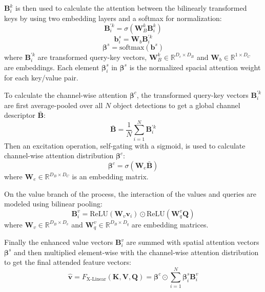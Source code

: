 \documentclass[english,twoside,openright]{HYgraduMLDS}
\newcommand{\matr}[1]{\bm{#1}}
\newcommand{\vect}[1]{\bm{#1}}
\begin{document}
$\matr{B}_i^k$ is then used to calculate the attention between the bilinearly transformed keys by using two embedding layers and a softmax for normalization:
\begin{equation}
\matr{B}_i^{'k} = \sigma(\matr{W}^k_B \matr{B}^k_i)
\end{equation}
\begin{equation}
\vect{b}^s_i = \matr{W}_b \matr{B}^{'k}_i
\end{equation}
\begin{equation}
\matr{\beta}^s = \text{softmax}(\vect{b}^s)
\end{equation}
%
where $\matr{B}_i^{'k}$ are transformed query-key vectors, $\matr{W}^k_B \in \mathbb{R}^{D_c \times D_B}$ and $\matr{W}_b \in \mathbb{R}^{1 \times D_C}$ are embeddings. Each element $\matr{\beta}^s_i$ in $\matr{\beta}^s$ is the normalized spacial attention weight for each key/value pair.

To calculate the channel-wise attention $\matr{\beta}^c$, the transformed query-key vectors $\matr{B}^{'k}_i$ are first average-pooled over all $N$ object detections to get a global channel descriptor $\bar{\matr{B}}$:
\begin{equation}
\bar{\matr{B}} = \frac{1}{N} \sum_{i=1}^N \matr{B}^{'k}_i
\end{equation}
%
Then an excitation operation, self-gating with a sigmoid, is used to calculate channel-wise attention distribution $\matr{\beta}^c$:
\begin{equation}
\matr{\beta}^c = \sigma(\matr{W}_e \bar{\matr{B}})
\end{equation}
%
where $\matr{W}_e \in \mathbb{R}^{D_B \times D_C}$ is an embedding matrix.

On the value branch of the process, the interaction of the values and queries are modeled using bilinear pooling:
\begin{equation}
\matr{B}_i^v = \text{ReLU}(\matr{W}_v \vect{v}_i) \odot \text{ReLU}(\matr{W}^v_q \matr{Q})
\end{equation}
%
where $\matr{W}_v \in \mathbb{R}^{D_B \times D_v}$ and $\matr{W}^v_q \in \mathbb{R}^{D_B \times D_q}$ are embedding matrices.

Finally the enhanced value vectors $\matr{B}_i^v$ are summed with spatial attention vectors $\matr{\beta}^s$ and then multiplied element-wise with the channel-wise attention distribution to get the final attended feature vectors:
\begin{equation}
\hat{\vect{v}} = F_\text{X-Linear}(\matr{K}, \matr{V}, \matr{Q}) = \matr{\beta}^c \odot \sum_{i=1}^N \matr{\beta}^s_i \matr{B}^v_i
\end{equation}
\end{document}
